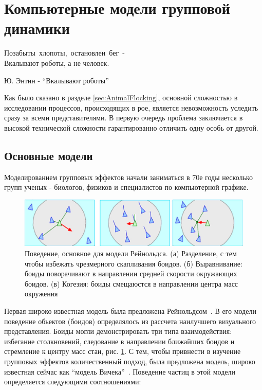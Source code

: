 \section{Компьютерные модели групповой динамики} %
\label{sec:ComputerModelsOfHords}

\epigraph{Позабыты~хлопоты,~остановлен~бег~- \\
Вкалывают роботы, а не человек.}{Ю. Энтин - ``Вкалывают роботы''}
Как было сказано в разделе \ref{sec:AnimalFlocking}, основной сложностью в исследовании процессов, происходящих в рое, является невозможность уследить сразу за всеми представителями. В первую очередь проблема заключается в высокой технической сложности гарантированно отличить одну особь от другой.

    \subsection{Основные модели} %
    \label{sub:CompModelsBasics}
    Моделированием групповых эффектов начали заниматься в 70е годы несколько групп ученых - биологов, физиков и специалистов по компьютерной графике. 
    \begin{figure}
        \centering
        \includegraphics[width=\textwidth]{Images/Fig31_CollectiveMotion}
        \caption{Поведение, основное для модели Рейнольдса. (а) Разделение, с тем чтобы избежать чрезмерного скапливания боидов. (б) Выравнивание: боиды поворачивают в направлении средней скорости окружающих боидов. (в) Когезия: боиды смещаюстся в направлении центра масс окружения}
        \label{fig:ReynoldsModel}
    \end{figure}
    Первая широко известная модель была предложена Рейнольдсом~\cite{reynolds1987}. В его модели поведение обьектов (боидов) определялось из рассчета наилучшего визуального представления. Боиды могли демонстрировать три типа взаимодействия: избегание столкновений, следование в направлении ближайших боидов и стремление к центру масс стаи, рис. \ref{fig:ReynoldsModel}. С тем, чтобы привнести в изучение групповых эффектов количественный подход, была предложена модель, широко известная сейчас как ``модель Вичека''~\cite{vicsek1995}. Поведение частиц в этой модели определяется следующими соотношениями:
